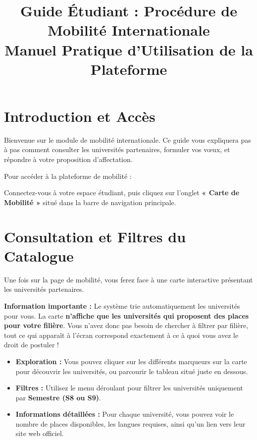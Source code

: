 \documentclass[12pt,a4paper]{article}
\title{\textbf{Guide Étudiant : Procédure de Mobilité Internationale}\\ \large Manuel Pratique d'Utilisation de la Plateforme}
\begin{document}
\maketitle
\tableofcontents
\newpage

\section{Introduction et Accès}
Bienvenue sur le module de mobilité internationale. Ce guide vous expliquera pas à pas comment consulter les universités partenaires, formuler vos vœux, et répondre à votre proposition d'affectation.

Pour accéder à la plateforme de mobilité :
\begin{tcolorbox}[colback=blue!5!white,colframe=blue!75!black,title=Accès au module]
Connectez-vous à votre espace étudiant, puis cliquez sur l'onglet \textbf{« Carte de Mobilité »} situé dans la barre de navigation principale.
\end{tcolorbox}

\section{Consultation et Filtres du Catalogue}
Une fois sur la page de mobilité, vous ferez face à une carte interactive présentant les universités partenaires. 

\begin{tcolorbox}[colback=blue!5!white,colframe=blue!75!black,title=Affichage Automatique par Filière]
\textbf{Information importante :} Le système trie automatiquement les universités pour vous. La carte \textbf{n'affiche que les universités qui proposent des places pour votre filière}. Vous n'avez donc pas besoin de chercher à filtrer par filière, tout ce qui apparaît à l'écran correspond exactement à ce à quoi vous avez le droit de postuler !
\end{tcolorbox}

\begin{itemize}[leftmargin=*]
    \item \textbf{Exploration :} Vous pouvez cliquer sur les différents marqueurs sur la carte pour découvrir les universités, ou parcourir le tableau situé juste en dessous.
    \item \textbf{Filtres :} Utilisez le menu déroulant pour filtrer les universités uniquement par \textbf{Semestre (S8 ou S9)}.
    \item \textbf{Informations détaillées :} Pour chaque université, vous pouvez voir le nombre de places disponibles, les langues requises, ainsi qu'un lien vers leur site web officiel.
\end{itemize}
\end{document}
